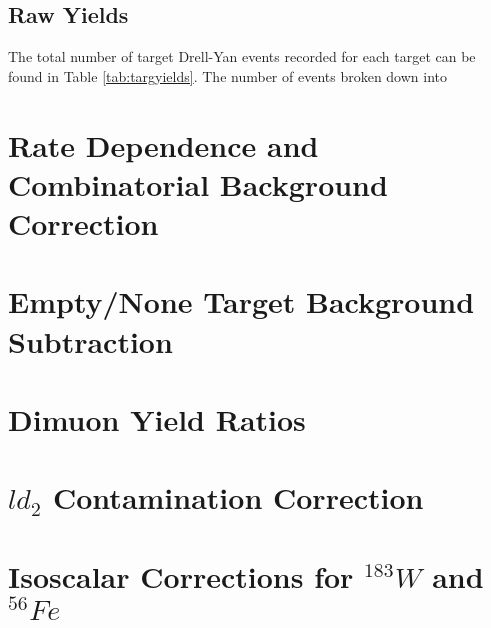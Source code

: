 \subsection{Raw Yields}

The total number of target Drell-Yan events recorded for each target can be found in Table
\ref{tab:targyields}. The number of events broken down into 

\section{Rate Dependence and Combinatorial Background Correction}



\section{Empty/None Target Background Subtraction}



\section{Dimuon Yield Ratios}



\section{$ld_2$ Contamination Correction}



\section{Isoscalar Corrections for $^{183}W$ and $^{56}Fe$}



